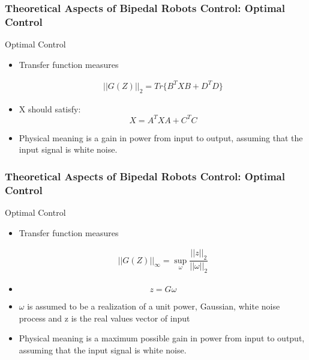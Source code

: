 \documentclass{beamer}
\begin{document}

\begin{frame}
	\frametitle{Theoretical Aspects of Bipedal Robots Control: Optimal Control}
	\begin{block}{Optimal Control}
		\begin{itemize}
			\item
				Transfer function measures
				
				\begin{equation}
					\begin{split}
						||G(Z)||_2 = Tr\{ B^{T} XB + D^{T} D \}
					\end{split}
				\end{equation}
			\item
				X should satisfy:
				\begin{equation}
					X = A^TXA + C^TC
				\end{equation}
			\item
				Physical meaning is a gain in power from input to output, assuming that the input signal is white noise.
		\end{itemize}
	\end{block}
\end{frame}


	\begin{frame}
		\frametitle{Theoretical Aspects of Bipedal Robots Control: Optimal Control}
		\begin{block}{Optimal Control}
			\begin{itemize}
				\item
					Transfer function measures
					
					\begin{equation}
						\begin{split}
							||G(Z)||_\infty = \sup_{\omega} \dfrac{||z||_2}{||\omega||_2}
						\end{split}
					\end{equation}
				\item
					\begin{equation}
					z  =G \omega
					\end{equation}
				\item
					$\omega$ is assumed to be a realization of a unit power, Gaussian, white noise
					process and z is the real values vector of input
				\item
					Physical meaning is a maximum possible gain in power from input to output, assuming that the input signal is white noise.
			\end{itemize}
		\end{block}
	\end{frame}
\end{document}
